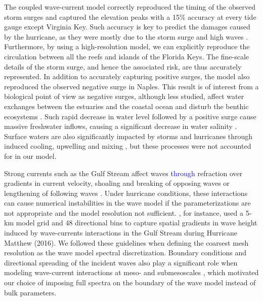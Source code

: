\documentclass[preprint,12pt,authoryear]{elsarticle}
\newcommand{\modif}[1]{\textcolor{blue}{#1}}
\begin{document}
The coupled wave-current model correctly reproduced the timing of the observed storm surges and captured the elevation peaks with a 15\% accuracy at every tide gauge except Virginia Key. Such accuracy is key to predict the damages caused by the hurricane, as they were mostly due to the storm surge and  high waves \citep{xian2018brief}. Furthermore, by using a high-resolution model, we can explicitly reproduce the circulation between all the reefs and islands of the Florida Keys. The fine-scale details of the storm surge, and hence the associated risk, are thus accurately represented. In addition to accurately capturing positive surges, the model also reproduced the observed negative surge in Naples. This result is of interest from a biological point of view as negative surges, although less studied, affect water exchanges between the estuaries and the coastal ocean and disturb the benthic ecosystems \citep{liu2020impacts}. Such rapid decrease in water level followed by a positive surge cause massive freshwater inflows, causing a significant decrease in water salinity \citep{wachnicka2019hurricane}. Surface waters are also significantly impacted by storms and hurricanes through induced cooling, upwelling and mixing \citep{varlas2020investigating}, but these processes were not accounted for in our model.

Strong currents such as the Gulf Stream affect waves \modif{through} refraction over gradients in current velocity, shoaling and breaking of opposing waves or lengthening of following waves \citep{hegermiller2019wave}. Under hurricane conditions, these interactions can cause numerical instabilities in the wave model if the parameterizations are not appropriate and the model resolution not sufficient. \cite{hegermiller2019wave}, for instance, used a 5-km model grid and 48 directional bins to capture spatial gradients in wave height induced by wave-currents interactions in the Gulf Stream during Hurricane Matthew (2016). We followed these guidelines when defining the coarsest mesh resolution as the wave model spectral discretization. Boundary conditions and directional spreading of the incident waves also play a significant role when modeling wave-current interactions at meso- and submesoscales \citep{villas2020wave}, which motivated our choice of imposing full spectra on the boundary of the wave model instead of bulk parameters.
\end{document}
